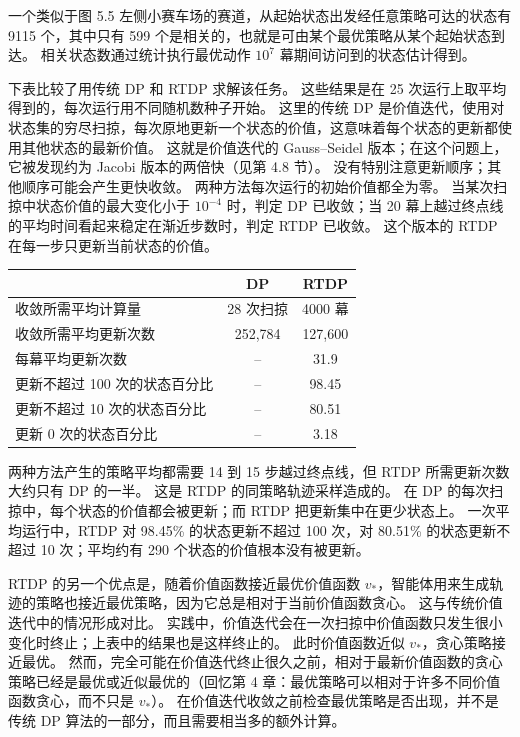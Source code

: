 \documentclass[UTF8, 12pt, fontset=fandol, oneside]{ctexart}
\begin{document}
一个类似于图 5.5 左侧小赛车场的赛道，从起始状态出发经任意策略可达的状态有 9115 个，其中只有 599 个是相关的，也就是可由某个最优策略从某个起始状态到达。
相关状态数通过统计执行最优动作 $10^7$ 幕期间访问到的状态估计得到。

下表比较了用传统 DP 和 RTDP 求解该任务。
这些结果是在 25 次运行上取平均得到的，每次运行用不同随机数种子开始。
这里的传统 DP 是价值迭代，使用对状态集的穷尽扫掠，每次原地更新一个状态的价值，这意味着每个状态的更新都使用其他状态的最新价值。
这就是价值迭代的 Gauss--Seidel 版本；在这个问题上，它被发现约为 Jacobi 版本的两倍快（见第 4.8 节）。
没有特别注意更新顺序；其他顺序可能会产生更快收敛。
两种方法每次运行的初始价值都全为零。
当某次扫掠中状态价值的最大变化小于 $10^{-4}$ 时，判定 DP 已收敛；当 20 幕上越过终点线的平均时间看起来稳定在渐近步数时，判定 RTDP 已收敛。
这个版本的 RTDP 在每一步只更新当前状态的价值。

\begin{center}
\begin{tabular}{lcc}
\toprule
 & DP & RTDP \\
\midrule
收敛所需平均计算量 & 28 次扫掠 & 4000 幕 \\
收敛所需平均更新次数 & 252,784 & 127,600 \\
每幕平均更新次数 & -- & 31.9 \\
更新不超过 100 次的状态百分比 & -- & 98.45 \\
更新不超过 10 次的状态百分比 & -- & 80.51 \\
更新 0 次的状态百分比 & -- & 3.18 \\
\bottomrule
\end{tabular}
\end{center}

两种方法产生的策略平均都需要 14 到 15 步越过终点线，但 RTDP 所需更新次数大约只有 DP 的一半。
这是 RTDP 的同策略轨迹采样造成的。
在 DP 的每次扫掠中，每个状态的价值都会被更新；而 RTDP 把更新集中在更少状态上。
一次平均运行中，RTDP 对 98.45\% 的状态更新不超过 100 次，对 80.51\% 的状态更新不超过 10 次；平均约有 290 个状态的价值根本没有被更新。

RTDP 的另一个优点是，随着价值函数接近最优价值函数 $v_*$，智能体用来生成轨迹的策略也接近最优策略，因为它总是相对于当前价值函数贪心。
这与传统价值迭代中的情况形成对比。
实践中，价值迭代会在一次扫掠中价值函数只发生很小变化时终止；上表中的结果也是这样终止的。
此时价值函数近似 $v_*$，贪心策略接近最优。
然而，完全可能在价值迭代终止很久之前，相对于最新价值函数的贪心策略已经是最优或近似最优的（回忆第 4 章：最优策略可以相对于许多不同价值函数贪心，而不只是 $v_*$）。
在价值迭代收敛之前检查最优策略是否出现，并不是传统 DP 算法的一部分，而且需要相当多的额外计算。
\end{document}

